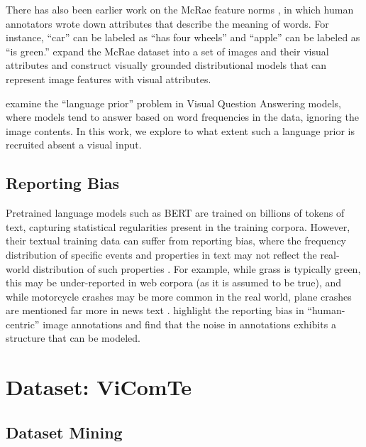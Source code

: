 \documentclass[11pt]{article}
\newcommand{\dataset}{ViComTe}
\begin{document}
There has also been earlier work on the McRae feature norms \citep{McRae2005SemanticFP}, in which human annotators wrote down attributes that describe the meaning of words. For instance, ``car'' can be labeled as ``has four wheels'' and ``apple'' can be labeled as ``is green.''
\citet{Silberer2013ModelsOS} expand the McRae dataset into a set of images and their visual attributes and construct visually grounded distributional models that can represent image features with visual attributes.

\citet{language-prior} examine the ``language prior'' problem in Visual Question Answering models, where models tend to answer based on word frequencies in the data, ignoring the image contents. In this work, we explore to what extent such a language prior is recruited absent a visual input.


\subsection{Reporting Bias}
\label{reporting-bias}

Pretrained language models such as BERT \cite{devlin-etal-2019-bert} are trained on billions of tokens of text, capturing statistical regularities present in the training corpora.
However, their textual training data can suffer from reporting bias, where the frequency distribution of specific events and properties in text may not reflect the real-world distribution of such properties \citep{Gordon2013ReportingBA}. For example, while grass is typically green, this may be under-reported in web corpora  (as it is assumed to be true), and while motorcycle crashes may be more common in the real world, plane crashes are mentioned far more in news text \citep{Gordon2013ReportingBA}.
\citet{misra2016seeing} highlight the reporting bias in ``human-centric'' image annotations and find that the noise in annotations exhibits a structure that can be modeled.

\section{Dataset: \dataset}

\subsection{Dataset Mining}
\end{document}
